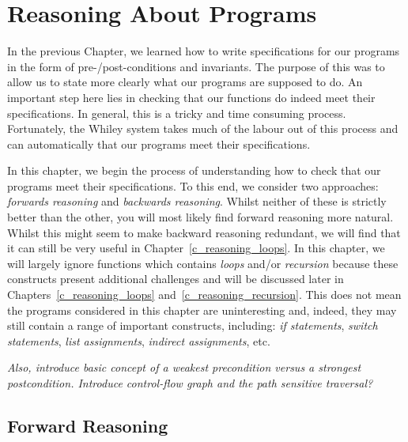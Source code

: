 \chapter{Reasoning About Programs}
In the previous Chapter, we learned how to write specifications for our programs in the form of pre-/post-conditions and invariants.  The purpose of this was to allow us to state more clearly what our programs are supposed to do.  An important step here lies in checking that our functions do indeed meet their specifications.  In general, this is a tricky and time consuming process.  Fortunately, the Whiley system takes much of the labour out of this process and can automatically that our programs meet their specifications.  

In this chapter, we begin the process of understanding how to check that our programs meet their specifications.  To this end, we consider two approaches: {\em forwards reasoning} and {\em backwards reasoning}.  Whilst neither of these is strictly better than the other, you will most likely find forward reasoning more natural.  Whilst this might seem to make backward reasoning redundant, we will find that it can still be very useful in Chapter~\ref{c_reasoning_loops}.  In this chapter, we will largely ignore functions which contains {\em loops} and/or {\em recursion} because these constructs present additional challenges and will be discussed later in Chapters~\ref{c_reasoning_loops} and~\ref{c_reasoning_recursion}.  This does not mean the programs considered in this chapter are uninteresting and, indeed, they may still contain a range of important constructs, including: {\em if statements}, {\em switch statements}, {\em list assignments}, {\em indirect assignments}, etc.

{\em Also, introduce basic concept of a weakest precondition versus a strongest postcondition.  Introduce control-flow graph and the path sensitive traversal?}

\section{Forward Reasoning}
\label{c_reasoning_forward}

